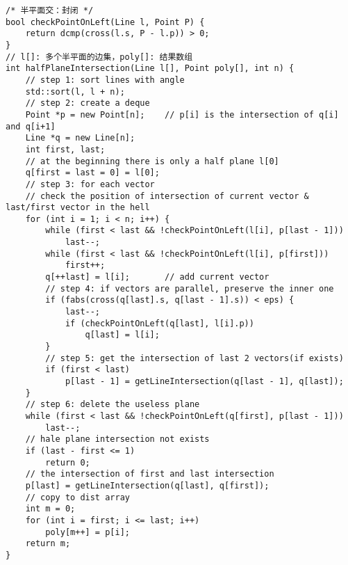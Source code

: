 \begin{verbatim}
/* 半平面交：封闭 */
bool checkPointOnLeft(Line l, Point P) {
    return dcmp(cross(l.s, P - l.p)) > 0;
}
// l[]: 多个半平面的边集，poly[]: 结果数组 
int halfPlaneIntersection(Line l[], Point poly[], int n) {
    // step 1: sort lines with angle 
    std::sort(l, l + n);
    // step 2: create a deque
    Point *p = new Point[n];    // p[i] is the intersection of q[i] and q[i+1]
    Line *q = new Line[n];
    int first, last;
    // at the beginning there is only a half plane l[0]
    q[first = last = 0] = l[0];
    // step 3: for each vector
    // check the position of intersection of current vector & last/first vector in the hell
    for (int i = 1; i < n; i++) {
        while (first < last && !checkPointOnLeft(l[i], p[last - 1]))
            last--;
        while (first < last && !checkPointOnLeft(l[i], p[first]))
            first++;
        q[++last] = l[i];       // add current vector
        // step 4: if vectors are parallel, preserve the inner one
        if (fabs(cross(q[last].s, q[last - 1].s)) < eps) {
            last--;
            if (checkPointOnLeft(q[last], l[i].p))
                q[last] = l[i];
        }
        // step 5: get the intersection of last 2 vectors(if exists)
        if (first < last)
            p[last - 1] = getLineIntersection(q[last - 1], q[last]);
    }
    // step 6: delete the useless plane
    while (first < last && !checkPointOnLeft(q[first], p[last - 1]))
        last--;
    // hale plane intersection not exists
    if (last - first <= 1)
        return 0;
    // the intersection of first and last intersection
    p[last] = getLineIntersection(q[last], q[first]);
    // copy to dist array
    int m = 0;
    for (int i = first; i <= last; i++)
        poly[m++] = p[i];
    return m;
}
\end{verbatim}
